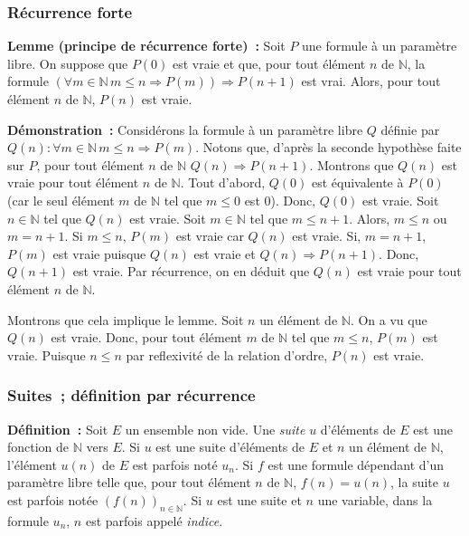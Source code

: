 \done

\subsubsection{Récurrence forte}

\noindent\textbf{Lemme (principe de récurrence forte) :} Soit $P$ une formule à un paramètre libre. 
    On suppose que $P(0)$ est vraie et que, pour tout élément $n$ de $\mathbb{N}$, la formule $(\forall m \in \mathbb{N} \, m \leq n \Rightarrow P(m)) \Rightarrow P(n+1)$ est vrai. 
    Alors, pour tout élément $n$ de $\mathbb{N}$, $P(n)$ est vraie. 

\medskip

\noindent\textbf{Démonstration :} Considérons la formule à un paramètre libre $Q$ définie par $Q(n): \forall m \in \mathbb{N} \, m \leq n \Rightarrow P(m)$. 
    Notons que, d'après la seconde hypothèse faite sur $P$, pour tout élément $n$ de $\mathbb{N}$ $Q(n) \Rightarrow P(n+1)$.
    Montrons que $Q(n)$ est vraie pour tout élément $n$ de $\mathbb{N}$. 
    Tout d'abord, $Q(0)$ est équivalente à $P(0)$ (car le seul élément $m$ de $\mathbb{N}$ tel que $m \leq 0$ est $0$). 
    Donc, $Q(0)$ est vraie. 
    Soit $n \in \mathbb{N}$ tel que $Q(n)$ est vraie. 
    Soit $m \in \mathbb{N}$ tel que $m \leq n+1$. 
    Alors, $m \leq n$ ou $m = n+1$. 
    Si $m \leq n$, $P(m)$ est vraie car $Q(n)$ est vraie.
    Si, $m = n+1$, $P(m)$ est vraie puisque $Q(n)$ est vraie et $Q(n) \Rightarrow P(n+1)$. 
    Donc, $Q(n+1)$ est vraie.
    Par récurrence, on en déduit que $Q(n)$ est vraie pour tout élément $n$ de $\mathbb{N}$.

    Montrons que cela implique le lemme. 
    Soit $n$ un élément de $\mathbb{N}$. 
    On a vu que $Q(n)$ est vraie. 
    Donc, pour tout élément $m$ de $\mathbb{N}$ tel que $m \leq n$, $P(m)$ est vraie. 
    Puisque $n \leq n$ par reflexivité de la relation d'ordre, $P(n)$ est vraie.

   \done 

\subsubsection{Suites ; définition par récurrence}
\label{subsub:suites}

\noindent\textbf{Définition :} Soit $E$ un ensemble non vide. 
    Une \textit{suite} $u$ d'éléments de $E$ est une fonction de $\mathbb{N}$ vers $E$. 
    Si $u$ est une suite d'éléments de $E$ et $n$ un élément de $\mathbb{N}$, l'élément $u(n)$ de $E$ est parfois noté $u_n$. 
    Si $f$ est une formule dépendant d'un paramètre libre telle que, pour tout élément $n$ de $\mathbb{N}$, $f(n) = u(n)$, la suite $u$ est parfois notée $\left( f(n) \right)_{n \in \mathbb{N}}$.
    Si $u$ est une suite et $n$ une variable, dans la formule $u_n$, $n$ est parfois appelé \textit{indice}.

